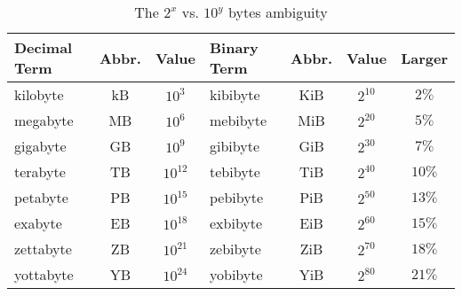 \begin{table}[H]
\centering
\begin{tabularx}{\textwidth}{|X|c|c|X|c|c|c|}
  \hline
  Decimal Term & Abbr. & Value & Binary Term & Abbr. & Value & Larger \\
  \hline
  \hline
  kilobyte & kB & $10^3$ & kibibyte & KiB & $2^{10}$ & $2\%$ \\
  \hline
  megabyte & MB & $10^6$ & mebibyte & MiB & $2^{20}$ & $5\%$ \\
  \hline
  gigabyte & GB & $10^9$ & gibibyte & GiB & $2^{30}$ & $7\%$ \\
  \hline
  terabyte & TB & $10^{12}$ & tebibyte & TiB & $2^{40}$ & $10\%$ \\
  \hline
  petabyte & PB & $10^{15}$ & pebibyte & PiB & $2^{50}$ & $13\%$ \\
  \hline
  exabyte  & EB & $10^{18}$ & exbibyte & EiB & $2^{60}$ & $15\%$ \\
  \hline
  zettabyte & ZB & $10^{21}$ & zebibyte & ZiB & $2^{70}$ & $18\%$ \\
  \hline
  yottabyte & YB & $10^{24}$ & yobibyte & YiB & $2^{80}$ & $21\%$ \\
  \hline
\end{tabularx}
\caption{The $2^x$ vs. $10^y$ bytes ambiguity}
\label{tab:hennpatt01}
\end{table}
